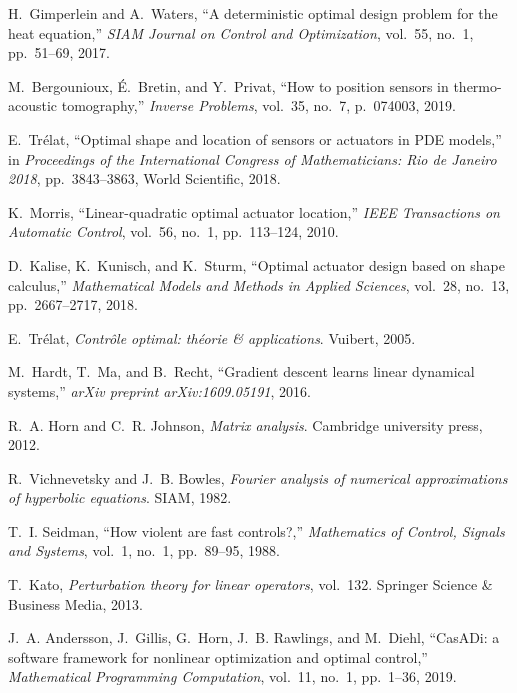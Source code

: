 \documentclass[journal,twoside,web]{ieeecolor}
\begin{document}
\begin{thebibliography}{10}
H.~Gimperlein and A.~Waters, ``A deterministic optimal design problem for the
  heat equation,'' {\em SIAM Journal on Control and Optimization}, vol.~55,
  no.~1, pp.~51--69, 2017.
  
M.~Bergounioux, {\'E}.~Bretin, and Y.~Privat, ``How to position sensors in
  thermo-acoustic tomography,'' {\em Inverse Problems}, vol.~35, no.~7,
  p.~074003, 2019.

E.~Tr{\'e}lat, ``Optimal shape and location of sensors or actuators in {PDE}
  models,'' in {\em Proceedings of the International Congress of
  Mathematicians: Rio de Janeiro 2018}, pp.~3843--3863, World Scientific, 2018.

K.~Morris, ``Linear-quadratic optimal actuator location,'' {\em IEEE
  Transactions on Automatic Control}, vol.~56, no.~1, pp.~113--124, 2010.

D.~Kalise, K.~Kunisch, and K.~Sturm, ``Optimal actuator design based on shape
  calculus,'' {\em Mathematical Models and Methods in Applied Sciences},
  vol.~28, no.~13, pp.~2667--2717, 2018.

E.~Tr{\'e}lat, {\em Contr{\^o}le optimal: th{\'e}orie \& applications}.
\newblock Vuibert, 2005.

M.~Hardt, T.~Ma, and B.~Recht, ``Gradient descent learns linear dynamical
  systems,'' {\em arXiv preprint arXiv:1609.05191}, 2016.

R.~A. Horn and C.~R. Johnson, {\em Matrix analysis}.
\newblock Cambridge university press, 2012.

R.~Vichnevetsky and J.~B. Bowles, {\em Fourier analysis of numerical
  approximations of hyperbolic equations}.
\newblock SIAM, 1982.

T.~I. Seidman, ``How violent are fast controls?,'' {\em Mathematics of Control,
  Signals and Systems}, vol.~1, no.~1, pp.~89--95, 1988.

T.~Kato, {\em Perturbation theory for linear operators}, vol.~132.
\newblock Springer Science \& Business Media, 2013.

J.~A. Andersson, J.~Gillis, G.~Horn, J.~B. Rawlings, and M.~Diehl, ``{CasADi}:
  a software framework for nonlinear optimization and optimal control,'' {\em
  Mathematical Programming Computation}, vol.~11, no.~1, pp.~1--36, 2019.


\end{thebibliography}
\end{document}
